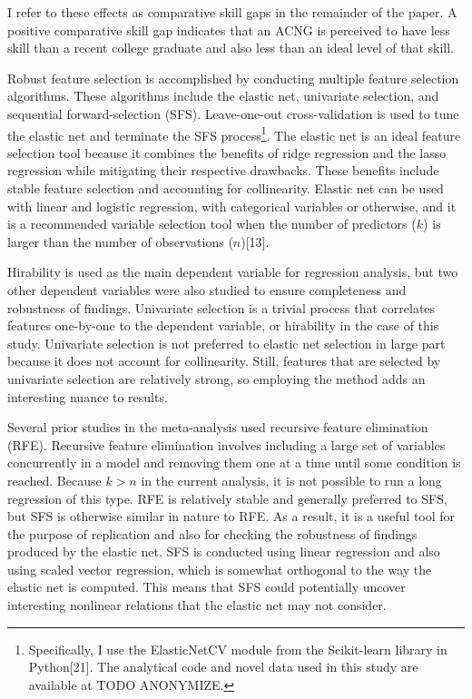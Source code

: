 \documentclass[review]{elsarticle}
\begin{document}
I refer to these effects as comparative skill gaps in the remainder of the paper.
A positive comparative skill gap
indicates that an ACNG is perceived to have less skill than a recent college graduate
and also less than an ideal level of that skill.

Robust feature selection is accomplished by conducting multiple feature selection algorithms.
These algorithms include the elastic net, univariate selection, and sequential forward-selection (SFS).
Leave-one-out cross-validation is used to tune the elastic net and terminate the SFS process\footnote{
    Specifically, I use the ElasticNetCV module from the Scikit-learn library in Python[21].
    The analytical code and novel data used in this study are available at TODO ANONYMIZE.
}.
The elastic net is an ideal feature selection tool because it combines the benefits of ridge regression and the lasso regression
while mitigating their respective drawbacks.
These benefits include stable feature selection and accounting for collinearity.
Elastic net can be used with linear and logistic regression, with categorical variables or otherwise,
and it is a recommended variable selection tool
when the number of predictors ($k$) is larger than the number of observations ($n$)[13].

Hirability is used as the main dependent variable for regression analysis,
but two other dependent variables were also studied to ensure completeness and robustness of findings.
Univariate selection is a trivial process that correlates features one-by-one to the dependent variable,
or hirability in the case of this study.
Univariate selection is not preferred to elastic net selection in large part because it does not account for collinearity.
Still, features that are selected by univariate selection are relatively strong, so employing the method adds an interesting nuance to results.

Several prior studies in the meta-analysis used recursive feature elimination (RFE).
Recursive feature elimination involves including a large set of variables concurrently in a model and removing them one at a time
until some condition is reached.
Because $k > n$ in the current analysis, it is not possible to run a long regression of this type.
RFE is relatively stable and generally preferred to SFS, but SFS is otherwise similar in nature to RFE.
As a result, it is a useful tool for the purpose of replication and also for checking the robustness of findings produced by the elastic net.
SFS is conducted using linear regression and also using scaled vector regression, which is somewhat orthogonal to the way the elastic net is computed.
This means that SFS could potentially uncover interesting nonlinear relations that the elastic net may not consider.
\end{document}
